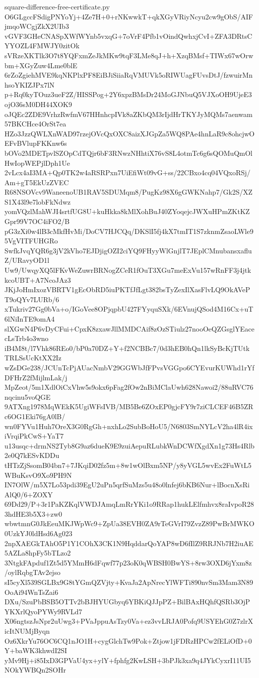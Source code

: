 \documentclass[11pt]{article}
\theoremstyle{definition}
\theoremstyle{remark}
\begin{document}
\begin{filecontents*}[overwrite]{square-difference-free-certificate.py}
O6GLgccFSdigPNYoYj+4Ze7H+0+rNKwwkT+qkXGyVRiyNcyu2cw9gObS/AIFjmqoWCgjZkX2UIb3
vGVF3GHeCNASpXWfWYnb5vxqG+7oVrF4Pfb1vOindQwhxjCvI+ZFA3DRtsCYYOZL4FMWJY0zitOk
sVRzeXKTlk3O7t8YQFxmZeJkMKw9tqF3LMe8qJ+h+XzqBMsf+TIWx67wOrwbm+XGyZuw4Lme0blE
6rZoZgiehMVE9kqNKPlxPF8EiBJiSiiaRqVMUVk5oRIWUagFUvsDtJ/fzwuirMnhsoYKIZJPx7lN
p+Rq0kyTOuz3ueF2Z/HISSPog+2Y6xpzBMsDr24MoGJNbuQ5VJXoOH9UjeE3ojO36sM0DH44XOK9
oJQEc2ZDE9VrhzRwfmV67HHnhcpIVk8aZKbQM3rIjdHrTKYJyMQMs7aenwam57BKCHce4OrSt7ea
HZo3JzzQWLXnWAD97rzejOVcQxOXC8aizXJGpZa5WQ8PAe4hnLaR9c8ohcjwOEFvBVlupFKKnw6s
bOVo2MDETpvlSZOpCdTQjr6bF3RNwzNHhtiX76vS8L4otmTc6g6sQOMuQmOlHwIopWEPjlDph1Ue
2vLcx4aI3MA+Qp0TK2w4aRSRPxn7UiEfiWt09vG+ss/22CBxo4cq04VQxoRSj/Am+gT5EkUzZVEC
R68NSOVcv9WaneenoUB1RAV5SDUMqm8/PugKz98X6gGWKNahp7/Gk2S/XZS1X43l9e7lobFkNdwz
yomVQzlMahWJI4srtfUG8U+kuHkka8kMlXohBuJ40ZYoqejcJWXuHPmZKtKZGpr99V7OC4iFO2/B
pG3zXi0w4lB3cMkfHvMi/DoCV7HJCQq/DKSlI5fj4kX7tmIT1S7zknmZsaoLWle95VgVITFUHGRo
SwfkJvqYQR6g3jV2kVho7EJDjigOZI2ciYQ9FHyyWlGnjlT7JEplCMnubansxafluZ/URavyOD1l
Uw9/UwqyXQ5lFKvWeZuwrBRNogZCeR1fOuT3XGu7meExVu157wRnFF3j4jtkkcoUBT+A7NcoJAz3
JKjJoHmIxozVBRTV1gEcObRD5iuPKTfJfLgt382bsTyZexIlXasFlvLQ9OkAVePT9oQYv7LURb/6
xTukriv27Gg0bVa+o/IGoVee8OPjqpbU427FYyquSXk/6EVnujQSod4M16Cx+uT6lNiInTE9omA4
slXGwN4P6vDyCFui+CpxK8zxawJllMMDCAif8zOzSTiulz27nooOeQZGsglYEacecLsTrb4o3wno
iB4M8t/l7Vhk86REo0/bP0a70DZ+Y+f2NCBBc7/0d3hEB0hQn1lkSyBcKjTUtkTRLSsUcKtXX2Iz
wZsDGe238/JCUnTcPjAUacNmbV29GGWbJfFPvsVGGpo6CYEvurKUWhd1rYfDFHrZ2fMijlmLak/j
MpZeot/5m1XdlOiCxVhw5s9okx6pFag2fOw2nBiMClaUwh628Nawoi2/88uRVC76nqcinu5voQGE
9ATXng1978MqWEkK5UgiWFsIVB/MB5Be6ZOxEP0gjcFY9r7ziCLCEF46B5ZRc6OG1Eki76gA0lB/
wn0FYVu1Huh7OreX3G0RgGh+nxhLo2SubBoHoU5/N6803SmNYLcV2ha4lR4ixiVrqiPkCwS+YaT7
u13usqc+drmNS2Tyb8G9az6dueK9E9zuiAepuRLubkWnDCWfXgdXn1g73Hs4Rlb2e0Q7kESvKDDu
tHTzZjSsomB04bn7+7JKqiD02fz5m+8w1wOlBxm5NP/y8yVGL5wvEx2FuWtL5WBuKsvO9Xo9PH9N
IN7OlW/m5X7Lo53pdi39EgU2uPn5qrfSuMzs5u48o0lnfej6bKB6Nur+lBocnXsRiAlQ0/6+ZOXY
69Dd29/P+3r1PaKZKqlVWDJAmqLmRrYKi1o9RRap1hukLElfmhvx8raIvpoR283hdHE3b5X3+zw0
wbwtmnG0JkEeuMKJWpWc9+ZpUa38EVH0ZA9rTeGVrI79ZvzZ89PwBrMWKO0UzkYJ0ldHsd6Ag023
2npXAEGkTAhO5P1Y1COhX3CK1N9HqddarQoYAP8wD6fIlZ9RRJNb7H2iuAE5AZLa8hpFy5bTLzo2
3NtgkFApduf1Zt5d5YMmH6dFqwf77p23oK0qWBSH0BwYS+8rw3OXD6jYxm8z/oylRqbgTAv2ejso
sI5cyXl539SGLBx9G8tYGmQZVjty+KvaJa2ApNrecYlWFTi890nvSm3Mam3N89OoAi94WnTsZai6
DXu/SzuPbBSB5OTTv2bBJHYUGbyq6YBKiQJJpPZ+BilBAxHQhfQSRb3OjPYKXrlQyoPYWy9RVLd7
X06ngtszJsNpr2uUwg3+PVaJppuAsTzy0Va+ez3vvLRJA0Pofq9USYEhG0Z7zlrXicItNUMjByqn
Oz6XkrYu76OC6CQ1nJO1H+cygGlchTw9Pok+Ztjow1jFDRzHPCw2fELiOfD+0Y+baWK3khwdI2SI
yMv9Hj+i85IxD3GPVaU4yx+ylY+fphfg2KwLSH+3bPJk3xa9q4JYkCyxrI11UI5NOkYWBQn2SOHr

\end{filecontents*}
\end{document}
